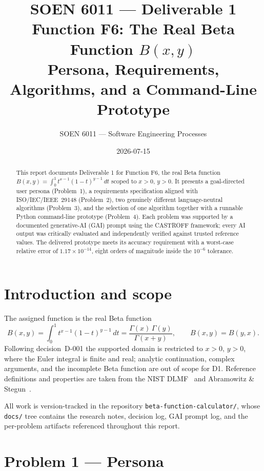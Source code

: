 \documentclass[11pt,a4paper]{article}
\title{\textbf{SOEN 6011 --- Deliverable 1}\\[2pt]
       \large Function F6: The Real Beta Function $B(x,y)$\\
       Persona, Requirements, Algorithms, and a Command-Line Prototype}
\author{SOEN 6011 --- Software Engineering Processes}
\date{2026-07-15}
\begin{document}
\maketitle

\begin{abstract}
\noindent This report documents Deliverable 1 for Function F6, the real Beta
function $B(x,y)=\int_0^1 t^{x-1}(1-t)^{y-1}\,dt$ scoped to $x>0,\,y>0$. It presents
a goal-directed user persona (Problem~1), a requirements specification aligned with
ISO/IEC/IEEE~29148 (Problem~2), two genuinely different language-neutral algorithms
(Problem~3), and the selection of one algorithm together with a runnable Python
command-line prototype (Problem~4). Each problem was supported by a documented
generative-AI (GAI) prompt using the CASTROFF framework; every AI output was
critically evaluated and independently verified against trusted reference values.
The delivered prototype meets its accuracy requirement with a worst-case relative
error of $1.17\times10^{-14}$, eight orders of magnitude inside the $10^{-6}$
tolerance.
\end{abstract}

\tableofcontents
\bigskip

\section{Introduction and scope}
The assigned function is the real Beta function
\[
  B(x,y)=\int_0^1 t^{x-1}(1-t)^{y-1}\,dt
        =\frac{\Gamma(x)\,\Gamma(y)}{\Gamma(x+y)},
  \qquad B(x,y)=B(y,x).
\]
Following decision~D-001 the supported domain is restricted to $x>0,\,y>0$, where the
Euler integral is finite and real; analytic continuation, complex arguments, and the
incomplete Beta function are out of scope for D1. Reference definitions and properties
are taken from the NIST DLMF~\cite{dlmf512} and Abramowitz \&
Stegun~\cite{abramowitz1964handbook}.

All work is version-tracked in the repository \texttt{beta-function-calculator/}, whose
\texttt{docs/} tree contains the research notes, decision log, GAI prompt log, and the
per-problem artifacts referenced throughout this report.

\section{Problem 1 --- Persona}
\label{sec:p1}
\end{document}
